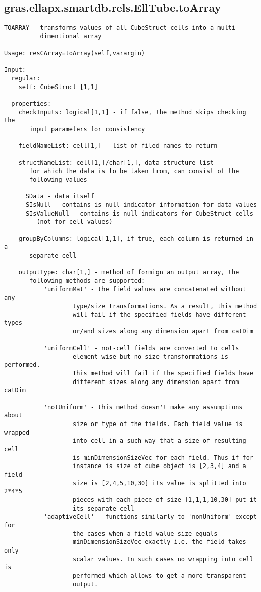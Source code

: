 \subsection{\texorpdfstring{gras.ellapx.smartdb.rels.EllTube.toArray}{toArray}}\label{method:gras.ellapx.smartdb.rels.EllTube.toArray}
\begin{verbatim}
TOARRAY - transforms values of all CubeStruct cells into a multi-
          dimentional array

Usage: resCArray=toArray(self,varargin)

Input:
  regular:
    self: CubeStruct [1,1]

  properties:
    checkInputs: logical[1,1] - if false, the method skips checking the
       input parameters for consistency

    fieldNameList: cell[1,] - list of filed names to return

    structNameList: cell[1,]/char[1,], data structure list
       for which the data is to be taken from, can consist of the
       following values

      SData - data itself
      SIsNull - contains is-null indicator information for data values
      SIsValueNull - contains is-null indicators for CubeStruct cells
         (not for cell values)

    groupByColumns: logical[1,1], if true, each column is returned in a
       separate cell

    outputType: char[1,] - method of formign an output array, the
       following methods are supported:
           'uniformMat' - the field values are concatenated without any
                   type/size transformations. As a result, this method
                   will fail if the specified fields have different types
                   or/and sizes along any dimension apart from catDim

           'uniformCell' - not-cell fields are converted to cells
                   element-wise but no size-transformations is performed.
                   This method will fail if the specified fields have
                   different sizes along any dimension apart from catDim

           'notUniform' - this method doesn't make any assumptions about
                   size or type of the fields. Each field value is wrapped
                   into cell in a such way that a size of resulting cell
                   is minDimensionSizeVec for each field. Thus if for
                   instance is size of cube object is [2,3,4] and a field
                   size is [2,4,5,10,30] its value is splitted into 2*4*5
                   pieces with each piece of size [1,1,1,10,30] put it
                   its separate cell
           'adaptiveCell' - functions similarly to 'nonUniform' except for
                   the cases when a field value size equals
                   minDimensionSizeVec exactly i.e. the field takes only
                   scalar values. In such cases no wrapping into cell is
                   performed which allows to get a more transparent
                   output.


\end{verbatim}
